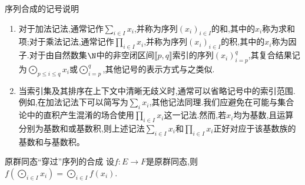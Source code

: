 \begin{remark}{序列合成的记号说明}{}
	\begin{enumerate}
		\item 对于加法记法,通常记作$\sum\limits_{i\in I}x_{i}$,并称为序列$\left(x_{i}\right)_{i\in I}$的和,其中的$x_{i}$称为求和项;对于乘法记法,通常记作$\prod\limits_{i\in I}x_{i}$,并称为序列$\left(x_{i}\right)_{i\in I}$的积,其中的$x_{i}$称为因子.对于由自然数集$\N$中的非空闭区间$\llbracket p,q\rrbracket$索引的序列$\left(x_{i}\right)_{i=p}^{q}$,其复合结果记为$\bigodot\limits_{p\leq i\leq q}x_{i}$或$\bigodot\limits_{i=p}^{q}$,其他记号的表示方式与之类似.
		\item 当索引集及其排序在上下文中清晰无歧义时,通常可以省略记号中的索引范围.例如,在加法记法下可以简写为$\sum\limits_{i}x_{i}$,其他记法同理.我们应避免在可能与集合论中的直积产生混淆的场合使用$\prod\limits_{i\in I}x_{i}$这一记法.然而,若$x_{i}$均为基数,且运算分别为基数和或基数积,则上述记法$\sum\limits_{i\in I}x_{i}$和$\prod\limits_{i\in I}x_{i}$正好对应于该基数族的基数和与基数积。
	\end{enumerate}
\end{remark}

\begin{proposition}{原群同态``穿过''序列的合成}{}
	设$f:E\to F$是原群同态,则$f\left(\bigodot\limits_{i\in I}x_{i}\right)=\bigodot\limits_{i\in I}f\left(x_{i}\right)$.
\end{proposition}
